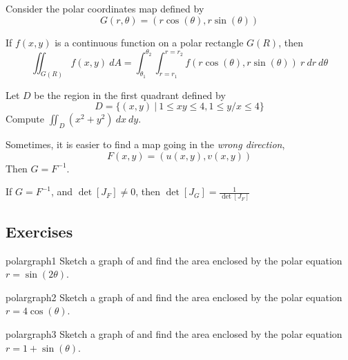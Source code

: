     \begin{example}
    Consider the polar coordinates map defined by $$G(r,\theta) = (r\cos(\theta), r\sin(\theta))$$

    \begin{corollary}
If $f(x,y)$ is a continuous function on a polar rectangle $G(R)$, then $$\iint_{G(R)} f(x,y) \ dA = \int_{\theta_1}^{\theta_2} \int_{r= r_1}^{r= r_2} f(r\cos(\theta), r\sin(\theta)) \ r \ dr \ d\theta$$
\end{corollary}
    \end{example}

    \begin{example}
        Let $D$ be the region in the first quadrant defined by $$D = \{ (x,y) \ | \ 1 \leq xy \leq 4, 1 \leq y/x \leq 4 \}$$
    Compute $\iint_D (x^2 + y^2) \ dx \ dy$.
    \end{example}

\begin{remark}
    Sometimes, it is easier to find a map going in the \textit{wrong direction}, $$F(x,y) = (u(x,y),v(x,y))$$
    Then $G = F^{-1}$.
    \end{remark}
    
    
    \begin{theorem}
    If $G = F^{-1}$, and $\det [J_F] \neq 0$, then $\det [J_G] = \frac{1}{\det [J_F]}$
    \end{theorem}





    \subsection{Exercises}

    \begin{problem}{polargraph1}
    Sketch a graph of and find the area enclosed by the polar equation $r = \sin(2\theta)$.
    \end{problem}

    \begin{problem}{polargraph2}
    Sketch a graph of and find the area enclosed by the polar equation $r = 4\cos(\theta)$.
    \end{problem}

    \begin{problem}{polargraph3}
    Sketch a graph of and find the area enclosed by the polar equation $r = 1+\sin(\theta)$.
    \end{problem}

